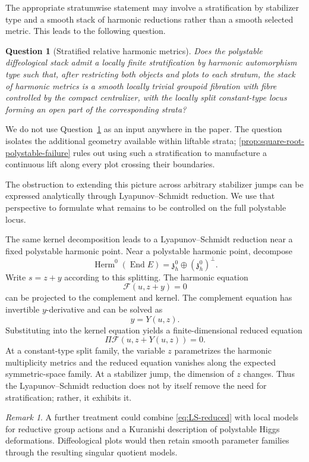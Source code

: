 \documentclass[11pt,reqno]{amsart}
\newtheorem{question}[theorem]{Question}
\theoremstyle{definition}
\theoremstyle{remark}
\newtheorem{remark}[theorem]{Remark}
\newcommand{\cF}{\mathcal F}
\newcommand{\End}{\operatorname{End}}
\newcommand{\Herm}{\operatorname{Herm}}
\begin{document}
The appropriate stratumwise statement may involve a stratification by stabilizer type and a smooth stack of harmonic reductions rather than a smooth selected metric.  This leads to the following question.

\begin{question}[Stratified relative harmonic metrics]\label{ques:stratified-poly}
Does the polystable diffeological stack admit a locally finite stratification by harmonic automorphism type such that, after restricting both objects and plots to each stratum, the stack of harmonic metrics is a smooth locally trivial groupoid fibration with fibre controlled by the compact centralizer, with the locally split constant-type locus forming an open part of the corresponding strata?
\end{question}

We do not use Question~\ref{ques:stratified-poly} as an input anywhere in the paper.  The question isolates the additional geometry available within liftable strata; \cref{prop:square-root-polystable-failure} rules out using such a stratification to manufacture a continuous lift along every plot crossing their boundaries.


The obstruction to extending this picture across arbitrary stabilizer jumps can be expressed analytically through Lyapunov--Schmidt reduction.  We use that perspective to formulate what remains to be controlled on the full polystable locus.


The same kernel decomposition leads to a Lyapunov--Schmidt reduction near a fixed polystable harmonic point.  Near a polystable harmonic point, decompose
\[
  \Herm^0(\End E)=\mathfrak z_h^0\oplus(\mathfrak z_h^0)^\perp.
\]
Write $s=z+y$ according to this splitting.  The harmonic equation
\[
  \cF(u,z+y)=0
\]
can be projected to the complement and kernel.  The complement equation has invertible $y$-derivative and can be solved as
\[
  y=Y(u,z).
\]
Substituting into the kernel equation yields a finite-dimensional reduced equation
\begin{equation}\label{eq:LS-reduced}
  \Pi\cF(u,z+Y(u,z))=0.
\end{equation}
At a constant-type split family, the variable $z$ parametrizes the harmonic multiplicity metrics and the reduced equation vanishes along the expected symmetric-space family.  At a stabilizer jump, the dimension of $z$ changes.  Thus the Lyapunov--Schmidt reduction does not by itself remove the need for stratification; rather, it exhibits it.

\begin{remark}
A further treatment could combine \eqref{eq:LS-reduced} with local models for reductive group actions and a Kuranishi description of polystable Higgs deformations.  Diffeological plots would then retain smooth parameter families through the resulting singular quotient models.
\end{remark}
\end{document}
